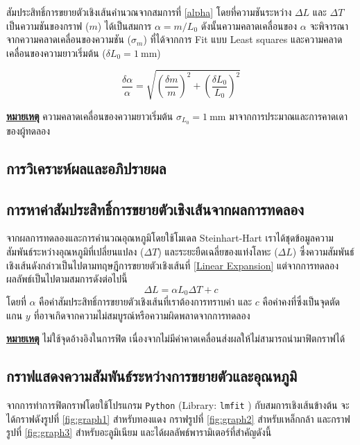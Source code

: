 \documentclass[11pt,a4paper]{article}
\begin{document}
สัมประสิทธิ์การขยายตัวเชิงเส้นคำนวณจากสมการที่ \ref{alpha} โดยที่ความชันระหว่าง $\Delta L$ และ $\Delta T$ เป็นความชันของกราฟ ($m$) ได้เป็นสมการ $\alpha = m/L_0$ ดังนั้นความคลาดเคลื่อนของ $\alpha$ จะพิจารณาจากความคลาดเคลื่อนของความชัน ($\sigma_ m$) ที่ได้จากการ Fit แบบ Least squares และความคลาดเคลื่อนของความยาวเริ่มต้น ($\delta L_0 = 1\ \text{mm}$)

\[
\frac{\delta \alpha}{\alpha} = \sqrt{ \left( \frac{\delta m}{m} \right)^2 + \left( \frac{\delta L_0}{L_0} \right)^2 }
\]

\textbf{\underline{หมายเหตุ}} ความคลาดเคลื่อนของความยาวเริ่มต้น $\sigma_{L_0} = 1\ \text{mm}$ มาจากการประมาณและการคาดเดาของผู้ทดลอง






\subsection{การวิเคราะห์ผลและอภิปรายผล} \label{analysis}

\subsection*{การหาค่าสัมประสิทธิ์การขยายตัวเชิงเส้นจากผลการทดลอง}

จากผลการทดลองและการคำนวณอุณหภูมิโดยใช้โมเดล Steinhart-Hart เราได้ชุดข้อมูลความสัมพันธ์ระหว่างอุณหภูมิที่เปลี่ยนแปลง ($\Delta T$) และระยะยืดเฉลี่ยของแท่งโลหะ ($\Delta L$) ซึ่งความสัมพันธ์เชิงเส้นดังกล่าวเป็นไปตามทฤษฎีการขยายตัวเชิงเส้นที่ \ref{Linear Expansion} แต่จากการทดลองผลลัพธ์เป็นไปตามสมการดังต่อไปนี้
\begin{equation}
\Delta L = \alpha L_0 \Delta T + c
\end{equation}
โดยที่ $\alpha$ คือค่าสัมประสิทธิ์การขยายตัวเชิงเส้นที่เราต้องการทราบค่า และ $c$ คือค่าคงที่ซึ่งเป็นจุดตัดแกน $y$ ที่อาจเกิดจากความไม่สมบูรณ์หรือความผิดพลาดจากการทดลอง

\textbf{\underline{หมายเหตุ}} ไม่ใช้จุดอ้างอิงในการฟิต เนื่องจากไม่มีค่าคาดเคลื่อนส่งผลให้ไม่สามารถนำมาฟิตกราฟได้


\newpage

\subsection*{กราฟแสดงความสัมพันธ์ระหว่างการขยายตัวและอุณหภูมิ} \label{graph}

\pagestyle{plain}
จากการทำการฟิตกราฟโดยใช้โปรแกรม \texttt{Python} (Library: \texttt{lmfit} \cite{LMFIT}) กับสมการเชิงเส้นข้างต้น จะได้กราฟดังรูปที่ \ref{fig:graph1} สำหรับทองแดง กราฟรูปที่ \ref{fig:graph2} สำหรับเหล็กกล้า และกราฟรูปที่ \ref{fig:graph3} สำหรับอะลูมิเนียม และได้ผลลัพธ์พารามิเตอร์ที่สำคัญดังนี้
\end{document}
